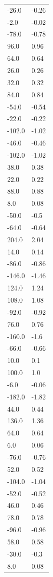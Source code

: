 \begin{longtable}{ll}
-26.0 & -0.26 \\
-2.0 & -0.02 \\
-78.0 & -0.78 \\
96.0 & 0.96 \\
64.0 & 0.64 \\
26.0 & 0.26 \\
32.0 & 0.32 \\
84.0 & 0.84 \\
-54.0 & -0.54 \\
-22.0 & -0.22 \\
-102.0 & -1.02 \\
-46.0 & -0.46 \\
-102.0 & -1.02 \\
38.0 & 0.38 \\
22.0 & 0.22 \\
88.0 & 0.88 \\
8.0 & 0.08 \\
-50.0 & -0.5 \\
-64.0 & -0.64 \\
204.0 & 2.04 \\
14.0 & 0.14 \\
-86.0 & -0.86 \\
-146.0 & -1.46 \\
124.0 & 1.24 \\
108.0 & 1.08 \\
-92.0 & -0.92 \\
76.0 & 0.76 \\
-160.0 & -1.6 \\
-66.0 & -0.66 \\
10.0 & 0.1 \\
100.0 & 1.0 \\
-6.0 & -0.06 \\
-182.0 & -1.82 \\
44.0 & 0.44 \\
136.0 & 1.36 \\
64.0 & 0.64 \\
6.0 & 0.06 \\
-76.0 & -0.76 \\
52.0 & 0.52 \\
-104.0 & -1.04 \\
-52.0 & -0.52 \\
46.0 & 0.46 \\
78.0 & 0.78 \\
-96.0 & -0.96 \\
58.0 & 0.58 \\
-30.0 & -0.3 \\
8.0 & 0.08 \\

\end{longtable}
